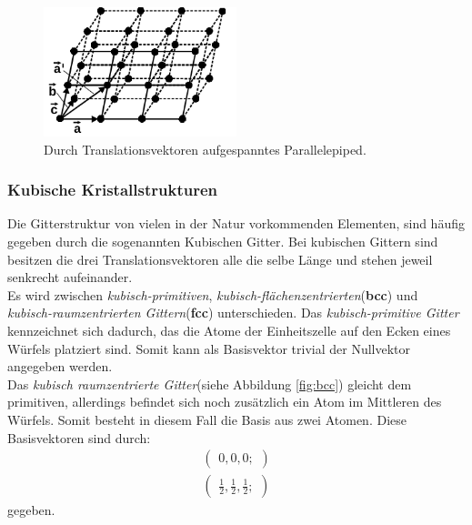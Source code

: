 \begin{figure}[hhh]
  \centering
  \includegraphics[width=0.5\textwidth]{abbildungen/epiped.png}
  \caption{Durch Translationsvektoren aufgespanntes Parallelepiped.\cite{sample}}
  \label{fig:abb2}
\end{figure}

\subsubsection{Kubische Kristallstrukturen}
\label{subsubsec:kubische_gitter}

Die Gitterstruktur von vielen in der Natur vorkommenden Elementen,
sind häufig gegeben durch die sogenannten Kubischen Gitter.
Bei kubischen Gittern sind besitzen die drei Translationsvektoren
alle die selbe Länge und stehen jeweil senkrecht aufeinander.\\
Es wird zwischen \textit{kubisch-primitiven},
\textit{kubisch-flächenzentrierten}(\textbf{bcc}) und \\
\textit{kubisch-raumzentrierten Gittern}(\textbf{fcc}) unterschieden.
Das \textit{kubisch-primitive Gitter}
kennzeichnet sich dadurch,
das die Atome der Einheitszelle auf den Ecken
eines Würfels platziert sind. Somit kann als Basisvektor trivial
der Nullvektor angegeben werden.\\
Das \textit{kubisch raumzentrierte Gitter}(siehe Abbildung \ref{fig:bcc})
gleicht dem primitiven, allerdings befindet sich noch
zusätzlich ein Atom im Mittleren des Würfels.
Somit besteht in diesem Fall die Basis aus zwei Atomen.
Diese Basisvektoren sind durch:
\begin{align}
  \label{eqn:2*}
  \begin{pmatrix}
    0, 0, 0;
  \end{pmatrix}\\
  \begin{pmatrix}
    \frac{1}{2}, \frac{1}{2}, \frac{1}{2};
  \end{pmatrix}
\end{align}
gegeben.\\

